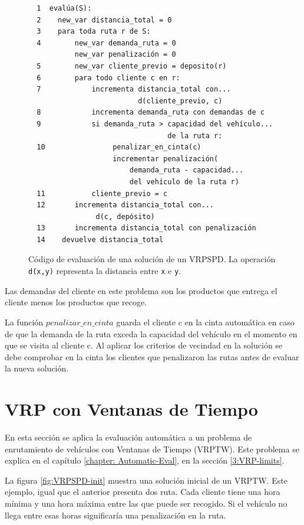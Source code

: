\begin{figure}[h!]
    \begin{verbatim} 
  1  evalúa(S):
  2    new_var distancia_total = 0
  3    para toda ruta r de S:         
  4        new_var demanda_ruta = 0
           new_var penalización = 0
  5        new_var cliente_previo = deposito(r)
  6        para todo cliente c en r:
  7            incrementa distancia_total con...
                          d(cliente_previo, c)
  8            incrementa demanda_ruta con demandas de c 
  9            si demanda_ruta > capacidad del vehículo...
                                 de la ruta r:
  10                penalizar_en_cinta(c)
                    incrementar penalización( 
                        demanda_ruta - capacidad...
                        del vehículo de la ruta r)
  11           cliente_previo = c
  12       incrementa distancia_total con...
                d(c, depósito) 
  13       incrementa distancia_total con penalización
  14    devuelve distancia_total        
  \end{verbatim}
    \caption{Código de evaluación de una solución de un VRPSPD. La operación \texttt{d(x,y)} representa la distancia entre \texttt{x} e \texttt{y}.\label{vrpspd-sol-code}}
\end{figure}

Las demandas del cliente en este problema son los productos que entrega el cliente menos los productos que recoge.

La función $penalizar\_en\_cinta$ guarda el cliente c en la cinta automática en caso de que la demanda de la ruta exceda la capacidad del vehículo en el momento en que se visita al cliente c. Al aplicar los criterios de vecindad en la solución se debe comprobar en la cinta los clientes que penalizaron las rutas antes de evaluar la nueva solución.

 \section{VRP con Ventanas de Tiempo}\label{4:VRPTW}
 En esta sección se aplica la evaluación automática a un problema de enrutamiento de vehículos con Ventanas de Tiempo (VRPTW). Este problema se explica en el capítulo \ref{chapter: Automatic-Eval}, en la sección \ref{3:VRP-limits}.
 
 La figura \ref{fig:VRPSPD-init} muestra una solución inicial de un VRPTW. Este ejemplo, igual que el anterior presenta dos ruta. Cada cliente tiene una hora mínima y una hora máxima entre las que puede ser recogido. Si el vehículo no llega entre esas horas significaría una penalización en la ruta.
 
